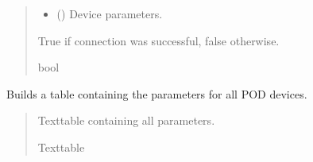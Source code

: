 \documentclass[letterpaper,10pt,english]{sphinxmanual}
\begin{document}
\begin{fulllineitems}
\begin{fulllineitems}
\begin{quote}
\begin{description}
\begin{itemize}
\item {} 
\sphinxAtStartPar
{} () \textendash{} Device parameters.

\end{itemize}

\sphinxAtStartPar
True if connection was successful, false otherwise.

\sphinxAtStartPar
bool

\end{description}\end{quote}

\end{fulllineitems}


\begin{fulllineitems}
\label{\detokenize{Setup.SetupOneDevice:Setup.SetupOneDevice.Setup_8480SC.Setup8480SC._GetPODdeviceParameterTable}}
\pysigstartsignatures
{}
\pysigstopsignatures
\sphinxAtStartPar
Builds a table containing the parameters for all POD devices.
\begin{quote}\begin{description}
\sphinxAtStartPar
Texttable containing all parameters.

\sphinxAtStartPar
Texttable

\end{description}\end{quote}

\end{fulllineitems}



\end{fulllineitems}
\end{document}

